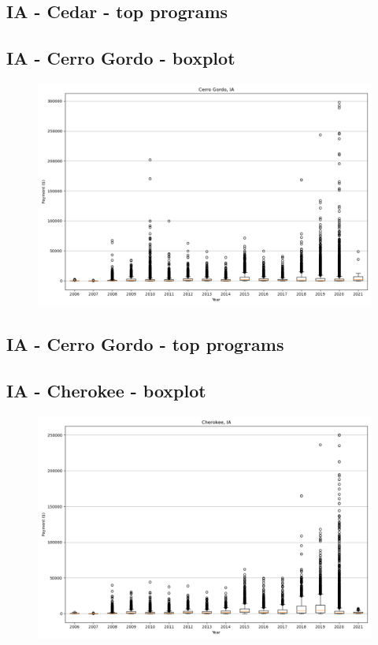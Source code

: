 \subsection*{IA - Cedar - top programs}

\newpage
\subsection*{IA - Cerro Gordo - boxplot}
\begin{figure}[h]
\centering
\includegraphics[width=7in]{../output/boxplots/counties/Cerro Gordo-IA_boxplot.png}
\end{figure}


\subsection*{IA - Cerro Gordo - top programs}

\newpage
\subsection*{IA - Cherokee - boxplot}
\begin{figure}[h]
\centering
\includegraphics[width=7in]{../output/boxplots/counties/Cherokee-IA_boxplot.png}
\end{figure}


